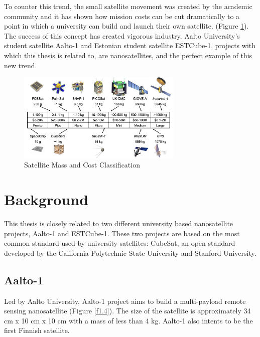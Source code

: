 To counter this trend, the small satellite movement was created by the academic community and it has shown how mission costs can be cut dramatically to a point in which a university can build and launch their own satellite. (Figure \ref{f1.3}). The success of this concept has created vigorous industry. Aalto University's student satellite Aalto-1 and Estonian student satellite ESTCube-1, projects with which this thesis is related to, are nanosatellites, and the perfect example of this new trend.\\

\begin{figure}[H]
\centerline{\includegraphics[width=0.7\textwidth]{images/satclass.png}}
\caption{Satellite Mass and Cost Classification \cite{BARN}}
\label{f1.3}
\end{figure}

\section{Background}\label{1.1}

This thesis is closely related to two different university based nanosatellite projects, Aalto-1 and ESTCube-1. These two projects are based on the most common standard used by university satellites: CubeSat\cite{CubeSat}, an open standard developed by the California Polytechnic State University and Stanford University.


\subsection{Aalto-1}

Led by Aalto University, Aalto-1 project aims to build a multi-payload remote sensing nanosatellite (Figure \ref{f1.4}). The size of the satellite is approximately 34 cm x 10 cm x 10 cm with a mass of less than 4 kg\cite{AALTO1a}. Aalto-1 also intents to be the first Finnish satellite.

